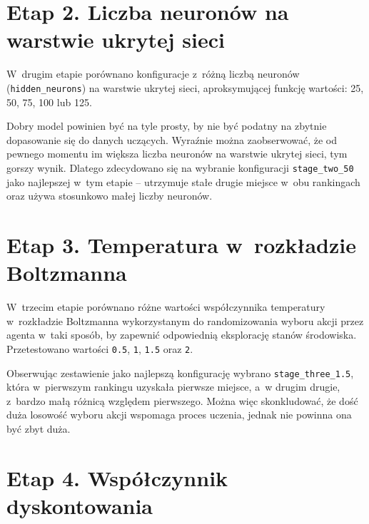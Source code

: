 \documentclass[a4paper, 12pt, oneside]{report}
\begin{document}
\section{Etap 2. Liczba neuronów na warstwie ukrytej sieci}

\begin{sloppypar}
 W~drugim etapie porównano konfiguracje z~różną liczbą neuronów (\texttt{hidden\_neurons}) na warstwie ukrytej sieci, aproksymującej funkcję wartości: 25, 50, 75, 100 lub 125.
\end{sloppypar}

\needspace{5em}



\needspace{5em}



Dobry model powinien być na tyle prosty, by nie być podatny na zbytnie dopasowanie się do danych uczących. Wyraźnie można zaobserwować, że od pewnego momentu im większa liczba neuronów na warstwie ukrytej sieci, tym gorszy wynik. Dlatego zdecydowano się na wybranie konfiguracji \texttt{stage\_two\_50} jako najlepszej w~tym etapie -- utrzymuje stałe drugie miejsce w~obu rankingach oraz używa stosunkowo małej liczby neuronów.

\section{Etap 3. Temperatura w~rozkładzie Boltzmanna}

 W~trzecim etapie porównano różne wartości współczynnika temperatury w~rozkładzie Boltzmanna wykorzystanym do randomizowania wyboru akcji przez agenta w~taki sposób, by zapewnić odpowiednią eksplorację stanów środowiska. Przetestowano wartości \texttt{0.5}, \texttt{1}, \texttt{1.5} oraz \texttt{2}.

\needspace{5em}



\needspace{5em}



Obserwując zestawienie jako najlepszą konfigurację wybrano \texttt{stage\_three\_1.5}, która w~pierwszym rankingu uzyskała pierwsze miejsce, a~w drugim drugie, z~bardzo małą różnicą względem pierwszego. Można więc skonkludować, że dość duża losowość wyboru akcji wspomaga proces uczenia, jednak nie powinna ona być zbyt duża. 

\section{Etap 4. Współczynnik dyskontowania}
\end{document}
